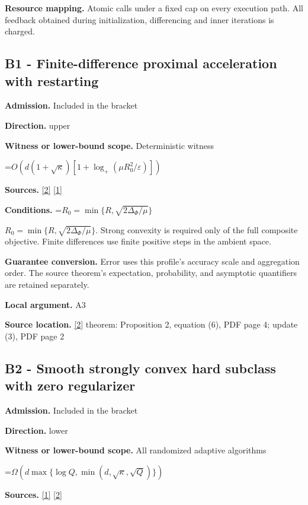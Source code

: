 \documentclass[10pt,a4paper]{article}
\newcommand{\AtlasMath}[1]{\par\begingroup\centering\setbox0=\hbox{$\displaystyle #1$}\ifdim\wd0>1.4\linewidth\typeout{ATLAS WIDE FORMULA: \the\wd0}\fi\ifdim\wd0>\linewidth\resizebox{\linewidth}{!}{\box0}\else\box0\fi\par\endgroup}
\newcommand{\AtlasInlineMath}[1]{\begingroup\setbox0=\hbox{$#1$}\ifdim\wd0>.4\linewidth\endgroup\AtlasMath{#1}\else\endgroup$#1$\fi}
\begin{document}
\textbf{Resource mapping.} Atomic calls under a fixed cap on every execution path. All feedback obtained during initialization, differencing and inner iterations is charged.

\subsection{B1 - Finite-difference proximal acceleration with restarting}
\textbf{Admission.} Included in the bracket

\textbf{Direction.} upper

\textbf{Witness or lower-bound scope.} Deterministic witness

\AtlasMath{O(d(1+\sqrt\kappa)[1+\log_+(\mu R_0^2/\varepsilon)])}
\textbf{Sources.} \href{https://papers.neurips.cc/paper_files/paper/2011/file/8f7d807e1f53eff5f9efbe5cb81090fb-Paper.pdf}{[2]} \href{https://arxiv.org/html/2610.00345v1}{[1]}

\textbf{Conditions.} \AtlasInlineMath{R_0=\min\{R,\sqrt{2\Delta_\Phi/\mu}\}}. Strong convexity is required only of the full composite objective. Finite differences use finite positive steps in the ambient space.

\textbf{Guarantee conversion.} Error uses this profile's accuracy scale and aggregation order. The source theorem's expectation, probability, and asymptotic quantifiers are retained separately.

\textbf{Local argument.} A3

\textbf{Source location.} \href{https://papers.neurips.cc/paper_files/paper/2011/file/8f7d807e1f53eff5f9efbe5cb81090fb-Paper.pdf}{[2]} theorem: Proposition 2, equation (6), PDF page 4; update (3), PDF page 2

\subsection{B2 - Smooth strongly convex hard subclass with zero regularizer}
\textbf{Admission.} Included in the bracket

\textbf{Direction.} lower

\textbf{Witness or lower-bound scope.} All randomized adaptive algorithms

\AtlasMath{\Omega(d\max\{\log Q,\min(d,\sqrt\kappa,\sqrt Q)\})}
\textbf{Sources.} \href{https://arxiv.org/html/2610.00345v1}{[1]} \href{https://papers.neurips.cc/paper_files/paper/2011/file/8f7d807e1f53eff5f9efbe5cb81090fb-Paper.pdf}{[2]}
\end{document}
